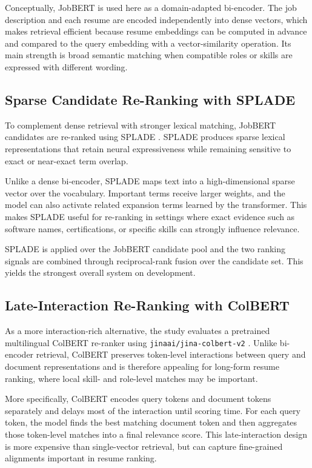 \documentclass[
]{ceurart}
\begin{document}
Conceptually, JobBERT is used here as a domain-adapted bi-encoder. The job description
and each resume are encoded independently into dense vectors, which makes retrieval
efficient because resume embeddings can be computed in advance and compared to the
query embedding with a vector-similarity operation. Its main strength is broad semantic
matching when compatible roles or skills are expressed with different wording.

\subsection{Sparse Candidate Re-Ranking with SPLADE}

To complement dense retrieval with stronger lexical matching, JobBERT candidates are re-ranked
using SPLADE \cite{splade,spladev2}. SPLADE produces sparse lexical
representations that retain neural expressiveness while remaining sensitive to exact
or near-exact term overlap.

Unlike a dense bi-encoder, SPLADE maps text into a high-dimensional sparse vector
over the vocabulary. Important terms receive larger weights, and the model can also
activate related expansion terms learned by the transformer. This makes SPLADE useful
for re-ranking in settings where exact evidence such as software names, certifications,
or specific skills can strongly influence relevance.

SPLADE is applied over the JobBERT candidate pool and the two ranking signals are combined
through reciprocal-rank fusion over the candidate set. This yields the strongest
overall system on development.

\subsection{Late-Interaction Re-Ranking with ColBERT}

As a more interaction-rich alternative, the study evaluates a pretrained multilingual
ColBERT re-ranker using \texttt{jinaai/jina-colbert-v2} \cite{colbert,jinacolbert}.
Unlike bi-encoder retrieval, ColBERT preserves token-level interactions between
query and document representations and is therefore appealing for long-form resume
ranking, where local skill- and role-level matches may be important.

More specifically, ColBERT encodes query tokens and document tokens separately and
delays most of the interaction until scoring time. For each query token, the model
finds the best matching document token and then aggregates those token-level matches
into a final relevance score. This late-interaction design is more expensive than
single-vector retrieval, but can capture fine-grained alignments important in resume ranking.
\end{document}
